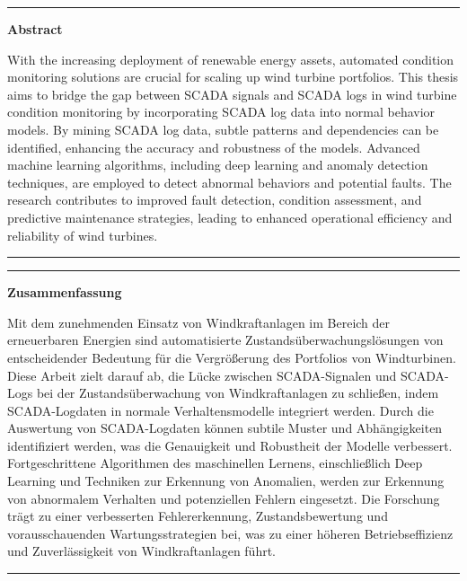 \documentclass[a4paper,11pt,twoside]{ThesisStyle}
\begin{document}



\dominitoc


\cleardoublepage
\begin{vcenterpage}
\noindent\rule[2pt]{\textwidth}{0.5pt}
\begin{center}
{\large\textbf{Abstract\\}}
\end{center}
With the increasing deployment of renewable energy assets, automated condition monitoring solutions are crucial for scaling up wind turbine portfolios. 
This thesis aims to bridge the gap between SCADA signals and SCADA logs in wind turbine condition monitoring by incorporating SCADA log data into normal behavior models. 
By mining SCADA log data, subtle patterns and dependencies can be identified, enhancing the accuracy and robustness of the models. 
Advanced machine learning algorithms, including deep learning and anomaly detection techniques, are employed to detect abnormal behaviors and potential faults. 
The research contributes to improved fault detection, condition assessment, and predictive maintenance strategies, leading to enhanced operational efficiency and reliability of wind turbines.
\noindent\rule[2pt]{\textwidth}{0.5pt}
\end{vcenterpage}

\clearpage
\begin{vcenterpage}
\noindent\rule[2pt]{\textwidth}{0.5pt}
\begin{center}
{\large\textbf{Zusammenfassung\\}}
\end{center}
Mit dem zunehmenden Einsatz von Windkraftanlagen im Bereich der erneuerbaren Energien sind automatisierte Zustandsüberwachungslösungen von entscheidender Bedeutung für die Vergrößerung des Portfolios von Windturbinen. 
Diese Arbeit zielt darauf ab, die Lücke zwischen SCADA-Signalen und SCADA-Logs bei der Zustandsüberwachung von Windkraftanlagen zu schließen, indem SCADA-Logdaten in normale Verhaltensmodelle integriert werden. 
Durch die Auswertung von SCADA-Logdaten können subtile Muster und Abhängigkeiten identifiziert werden, was die Genauigkeit und Robustheit der Modelle verbessert. 
Fortgeschrittene Algorithmen des maschinellen Lernens, einschließlich Deep Learning und Techniken zur Erkennung von Anomalien, werden zur Erkennung von abnormalem Verhalten und potenziellen Fehlern eingesetzt. 
Die Forschung trägt zu einer verbesserten Fehlererkennung, Zustandsbewertung und vorausschauenden Wartungsstrategien bei, was zu einer höheren Betriebseffizienz und Zuverlässigkeit von Windkraftanlagen führt.
\noindent\rule[2pt]{\textwidth}{0.5pt}
\end{vcenterpage}
\end{document}
